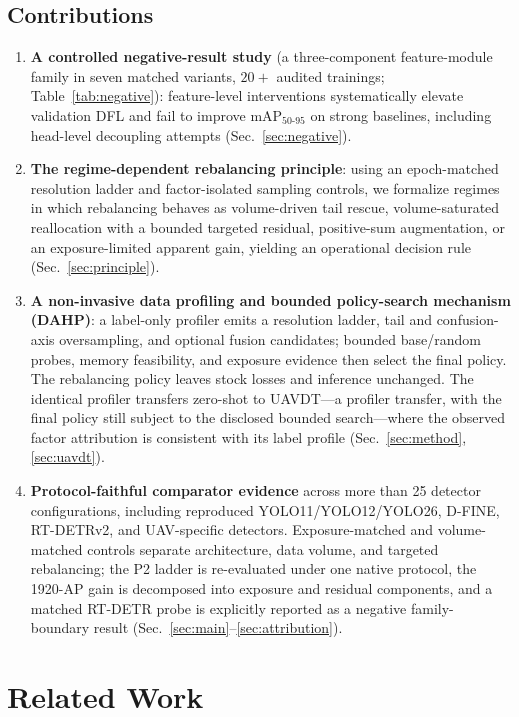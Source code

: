 \documentclass[journal]{IEEEtran}
\newcommand{\map}{\ensuremath{\mathrm{mAP}}}
\newcommand{\ap}{\ensuremath{\mathrm{AP}}}
\newcommand{\uavdt}{UAVDT}
\begin{document}
\subsection{Contributions}
\begin{enumerate}
\item \textbf{A controlled negative-result study} (a three-component feature-module family in seven matched variants, $20+$ audited trainings; Table~\ref{tab:negative}): feature-level interventions systematically elevate validation DFL and fail to improve $\map_{50\text{-}95}$ on strong baselines, including head-level decoupling attempts (Sec.~\ref{sec:negative}).
\item \textbf{The regime-dependent rebalancing principle}: using an epoch-matched resolution ladder and factor-isolated sampling controls, we formalize regimes in which rebalancing behaves as volume-driven tail rescue, volume-saturated reallocation with a bounded targeted residual, positive-sum augmentation, or an exposure-limited apparent gain, yielding an operational decision rule (Sec.~\ref{sec:principle}).
\item \textbf{A non-invasive data profiling and bounded policy-search mechanism (DAHP)}: a label-only profiler emits a resolution ladder, tail and confusion-axis oversampling, and optional fusion candidates; bounded base/random probes, memory feasibility, and exposure evidence then select the final policy. The rebalancing policy leaves stock losses and inference unchanged. The identical profiler transfers zero-shot to \uavdt{}---a profiler transfer, with the final policy still subject to the disclosed bounded search---where the observed factor attribution is consistent with its label profile (Sec.~\ref{sec:method}, \ref{sec:uavdt}).
\item \textbf{Protocol-faithful comparator evidence} across more than 25 detector configurations, including reproduced YOLO11/YOLO12/YOLO26, D-FINE, RT-DETRv2, and UAV-specific detectors. Exposure-matched and volume-matched controls separate architecture, data volume, and targeted rebalancing; the P2 ladder is re-evaluated under one native protocol, the 1920-\ap{} gain is decomposed into exposure and residual components, and a matched RT-DETR probe is explicitly reported as a negative family-boundary result (Sec.~\ref{sec:main}--\ref{sec:attribution}).
\end{enumerate}

\section{Related Work}
\end{document}
